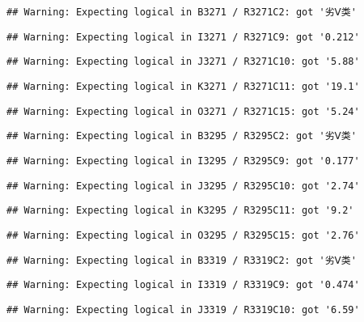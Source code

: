 \documentclass[
]{article}
\begin{document}
\begin{verbatim}
## Warning: Expecting logical in B3271 / R3271C2: got '劣Ⅴ类'
\end{verbatim}

\begin{verbatim}
## Warning: Expecting logical in I3271 / R3271C9: got '0.212'
\end{verbatim}

\begin{verbatim}
## Warning: Expecting logical in J3271 / R3271C10: got '5.88'
\end{verbatim}

\begin{verbatim}
## Warning: Expecting logical in K3271 / R3271C11: got '19.1'
\end{verbatim}

\begin{verbatim}
## Warning: Expecting logical in O3271 / R3271C15: got '5.24'
\end{verbatim}

\begin{verbatim}
## Warning: Expecting logical in B3295 / R3295C2: got '劣Ⅴ类'
\end{verbatim}

\begin{verbatim}
## Warning: Expecting logical in I3295 / R3295C9: got '0.177'
\end{verbatim}

\begin{verbatim}
## Warning: Expecting logical in J3295 / R3295C10: got '2.74'
\end{verbatim}

\begin{verbatim}
## Warning: Expecting logical in K3295 / R3295C11: got '9.2'
\end{verbatim}

\begin{verbatim}
## Warning: Expecting logical in O3295 / R3295C15: got '2.76'
\end{verbatim}

\begin{verbatim}
## Warning: Expecting logical in B3319 / R3319C2: got '劣Ⅴ类'
\end{verbatim}

\begin{verbatim}
## Warning: Expecting logical in I3319 / R3319C9: got '0.474'
\end{verbatim}

\begin{verbatim}
## Warning: Expecting logical in J3319 / R3319C10: got '6.59'
\end{verbatim}
\end{document}
